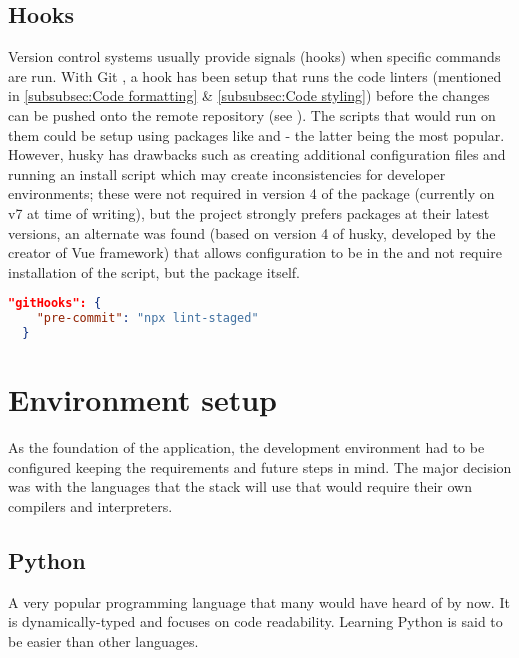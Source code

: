 \documentclass[../main.tex]{subfiles}
\begin{document}
\subsection{Hooks}

Version control systems usually provide signals (hooks) when specific commands are run. With Git \cite{gitGitHooks}, a  hook has been setup that runs the code linters (mentioned in \ref{subsubsec:Code formatting} \& \ref{subsubsec:Code styling}) before the changes can be pushed onto the remote repository (see ). The scripts that would run on them could be setup using packages like  and  - the latter being the most popular. However, husky has drawbacks such as creating additional configuration files and running an install script which may create inconsistencies for developer environments; these were not required in version 4 of the package (currently on v7 at time of writing), but the project strongly prefers packages at their latest versions, an alternate  was found (based on version 4 of husky, developed by the creator of Vue framework) that allows configuration to be in the  and not require installation of the script, but the package itself.

\begin{lstlisting}[language=json,caption={\citecode{PackageJson}}]
  "gitHooks": {
    "pre-commit": "npx lint-staged"
  }
\end{lstlisting}

\section{Environment setup}

As the foundation of the application, the development environment had to be configured keeping the requirements and future steps in mind. The major decision was with the languages that the stack will use that would require their own compilers and interpreters.

\subsection{Python}

A very popular programming language that many would have heard of by now. It is dynamically-typed and focuses on code readability. Learning Python is said to be easier than other languages.
\end{document}
